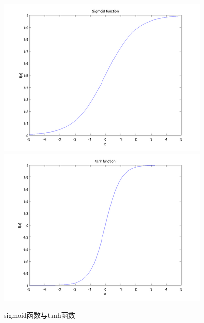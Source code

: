 \begin{figure}[!h]
	\centering
	\includegraphics[scale=0.8]{figures/chapter_2/Sigmoid_Function.png}
	\includegraphics[scale=0.8]{figures/chapter_2/Tanh_Function.png}
	\caption{sigmoid函数与tanh函数}\label{fig_2_2}
\end{figure}

